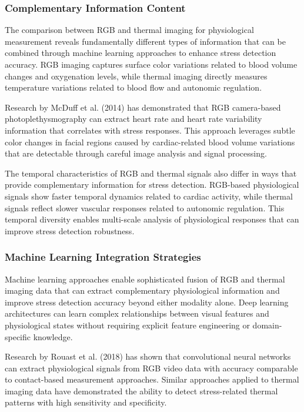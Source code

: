 \documentclass[12pt,a4paper]{article}
\begin{document}
\subsubsection{Complementary Information Content}

The comparison between RGB and thermal imaging for physiological measurement reveals fundamentally different types of
information that can be combined through machine learning approaches to enhance stress detection accuracy. RGB imaging
captures surface color variations related to blood volume changes and oxygenation levels, while thermal imaging directly
measures temperature variations related to blood flow and autonomic regulation.

Research by McDuff et al. (2014) has demonstrated that RGB camera-based photoplethysmography can extract heart rate and
heart rate variability information that correlates with stress responses. This approach leverages subtle color changes
in facial regions caused by cardiac-related blood volume variations that are detectable through careful image analysis
and signal processing.

The temporal characteristics of RGB and thermal signals also differ in ways that provide complementary information for
stress detection. RGB-based physiological signals show faster temporal dynamics related to cardiac activity, while
thermal signals reflect slower vascular responses related to autonomic regulation. This temporal diversity enables
multi-scale analysis of physiological responses that can improve stress detection robustness.

\subsubsection{Machine Learning Integration Strategies}

Machine learning approaches enable sophisticated fusion of RGB and thermal imaging data that can extract complementary
physiological information and improve stress detection accuracy beyond either modality alone. Deep learning
architectures can learn complex relationships between visual features and physiological states without requiring
explicit feature engineering or domain-specific knowledge.

Research by Rouast et al. (2018) has shown that convolutional neural networks can extract physiological signals from RGB
video data with accuracy comparable to contact-based measurement approaches. Similar approaches applied to thermal
imaging data have demonstrated the ability to detect stress-related thermal patterns with high sensitivity and
specificity.
\end{document}
